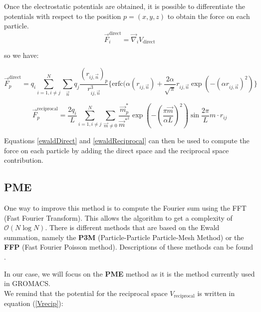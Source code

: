 \documentclass[10pt,twoside,a4paper]{report}
\begin{document}
Once the electrostatic potentials are obtained, it is possible to differentiate the potentials with respect to the position $p=(x,y,z)$ to obtain the force on each particle.\\

\begin{equation}
   \overrightarrow{F}_i^{\text{direct}} = \overrightarrow{\nabla}_i V_{\text{direct}} 
\end{equation}


so we have:

\begin{equation}
\label{ewaldDirect}
   \overrightarrow{F}_p^{\text{direct}} = q_i \sum\limits_{i=1,i\neq j}^N \sum\limits_{\vec{n}} q_j \frac{(r_{ij,\vec{n}})_p}{r_{ij,\vec{n}}^3}
   \{\text{erfc}(\alpha (r_{ij,\vec{n}}) + \frac{2\alpha}{\sqrt{\pi}} r_{ij,\vec{n}} \exp(-(\alpha r_{ij,\vec{n}})^2)\}
\end{equation}


\begin{equation}
\label{ewaldReciprocal}
   \overrightarrow{F}_p^{\text{reciprocal}} = \frac{2 q_i}{L} \sum\limits_{i=1,i\neq j}^N \sum_{\vec{m} \neq 0} \frac{\vec{m}_p^*}{\vec{m}^{*^2}} \exp{(-(\frac{\pi \vec{m}}{\alpha L})^2)}\sin{\frac{2\pi}{L} m \cdot r_{ij} }
\end{equation}

Equations \ref{ewaldDirect} and \ref{ewaldReciprocal} can then be used to compute the force on each particle by adding the direct space and the reciprocal space contribution.\\


\subsection{PME}
One way to improve this method is to compute the Fourier sum using the FFT (Fast Fourier Transform). This allows the algorithm to get a complexity of $\mathcal{O}(N\log N)$. There is different methods that are based on the Ewald summation, namely the \textbf{P3M} (Particle-Particle Particle-Mesh Method) or the \textbf{FFP} (Fast Fourier Poisson method). Descriptions of these methods can be found \cite{toukmaji1996ewald}. 

In our case, we will focus on the \textbf{PME} method as it is the method currently used in GROMACS. \\

We remind that the potential for the reciprocal space $V_{\text{reciprocal}}$ is written in equation (\ref{Vrecip}):
\end{document}
